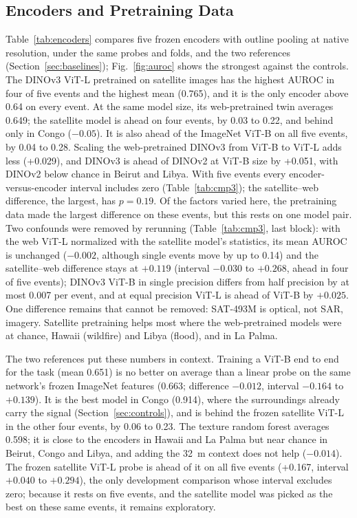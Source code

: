 \documentclass[journal]{IEEEtran}
\begin{document}
\subsection{Encoders and Pretraining Data}
\label{sec:res-encoders}
Table~\ref{tab:encoders} compares five frozen encoders with outline pooling at native resolution, under the same probes and folds, and the two references (Section~\ref{sec:baselines}); Fig.~\ref{fig:auroc} shows the strongest against the controls. The DINOv3 ViT-L pretrained on satellite images has the highest AUROC in four of five events and the highest mean (0.765), and it is the only encoder above 0.64 on every event. At the same model size, its web-pretrained twin averages 0.649; the satellite model is ahead on four events, by 0.03 to 0.22, and behind only in Congo ($-0.05$). It is also ahead of the ImageNet ViT-B on all five events, by 0.04 to 0.28. Scaling the web-pretrained DINOv3 from ViT-B to ViT-L adds less (+0.029), and DINOv3 is ahead of DINOv2 at ViT-B size by +0.051, with DINOv2 below chance in Beirut and Libya. With five events every encoder-versus-encoder interval includes zero (Table~\ref{tab:cmp3}); the satellite--web difference, the largest, has $p=0.19$. Of the factors varied here, the pretraining data made the largest difference on these events, but this rests on one model pair. Two confounds were removed by rerunning (Table~\ref{tab:cmp3}, last block): with the web ViT-L normalized with the satellite model's statistics, its mean AUROC is unchanged ($-0.002$, although single events move by up to 0.14) and the satellite--web difference stays at $+0.119$ (interval $-0.030$ to $+0.268$, ahead in four of five events); DINOv3 ViT-B in single precision differs from half precision by at most 0.007 per event, and at equal precision ViT-L is ahead of ViT-B by $+0.025$. One difference remains that cannot be removed: SAT-493M is optical, not SAR, imagery. Satellite pretraining helps most where the web-pretrained models were at chance, Hawaii (wildfire) and Libya (flood), and in La Palma.

The two references put these numbers in context. Training a ViT-B end to end for the task (mean 0.651) is no better on average than a linear probe on the same network's frozen ImageNet features (0.663; difference $-0.012$, interval $-0.164$ to $+0.139$). It is the best model in Congo (0.914), where the surroundings already carry the signal (Section~\ref{sec:controls}), and is behind the frozen satellite ViT-L in the other four events, by 0.06 to 0.23. The texture random forest averages 0.598; it is close to the encoders in Hawaii and La Palma but near chance in Beirut, Congo and Libya, and adding the 32~m context does not help ($-0.014$). The frozen satellite ViT-L probe is ahead of it on all five events (+0.167, interval $+0.040$ to $+0.294$), the only development comparison whose interval excludes zero; because it rests on five events, and the satellite model was picked as the best on these same events, it remains exploratory.
\end{document}
